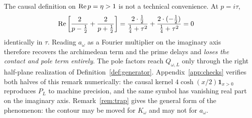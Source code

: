 \begin{remark}\label{rem:imaginary}
The causal definition on $\operatorname{Re} p=\eta>1$ is not a technical convenience. At
$p=i\tau$,
\[
 \operatorname{Re}\left[\frac2{p-\frac12}+\frac2{p+\frac12}\right]
 =\frac{2\cdot\frac12}{\frac14+\tau^2}+\frac{2\cdot(-\frac12)}{\frac14+\tau^2}
 =0
\]
identically in $\tau$. Reading $a_\omega$ as a Fourier multiplier on the
imaginary axis therefore recovers the archimedean term and the prime delays and
\emph{loses the contact and pole term entirely}. The pole factors reach
$Q_{\omega,L}$ only through the right half-plane realization of
Definition~\ref{def:generator}. Appendix~\ref{app:checks} verifies both halves of
this remark numerically: the causal kernel $4\cosh(x/2)\mathbf1_{x>0}$
reproduces $P_L$ to machine precision, and the same symbol has vanishing real
part on the imaginary axis. Remark~\ref{rem:trap} gives the general form of the
phenomenon: the contour may be moved for $K_\omega$ and may not for $a_\omega$.
\end{remark}
